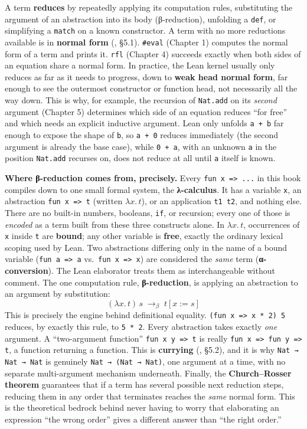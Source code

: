 A term \textbf{reduces} by repeatedly applying its computation rules, substituting the argument of an abstraction into its body (β-reduction), unfolding a \texttt{def}, or simplifying a \texttt{match} on a known constructor. A term with no more reductions available is in \textbf{normal form} (\cite{Pierce2002}, §5.1). \texttt{\#eval} (Chapter 1) computes the normal form of a term and prints it. \texttt{rfl} (Chapter 4) succeeds exactly when both sides of an equation share a normal form. In practice, the Lean kernel usually only reduces as far as it needs to progress, down to \textbf{weak head normal form}, far enough to see the outermost constructor or function head, not necessarily all the way down. This is why, for example, the recursion of \texttt{Nat.add} on its \emph{second} argument (Chapter 5) determines which side of an equation reduces ``for free'' and which needs an explicit inductive argument. Lean only unfolds \texttt{a + b} far enough to expose the shape of \texttt{b}, so \texttt{a + 0} reduces immediately (the second argument is already the base case), while \texttt{0 + a}, with an unknown \texttt{a} in the position \texttt{Nat.add} recurses on, does not reduce at all until \texttt{a} itself is known.

\textbf{Where β-reduction comes from, precisely.} Every \texttt{fun x => ...} in this book compiles down to one small formal system, the \textbf{λ-calculus}. It has a variable \texttt{x}, an abstraction \texttt{fun x => t} (written \(\lambda x.\, t\)), or an application \texttt{t1 t2}, and nothing else. There are no built-in numbers, booleans, \texttt{if}, or recursion; every one of those is \emph{encoded} as a term built from these three constructs alone. In \(\lambda x.\, t\), occurrences of \texttt{x} inside \texttt{t} are \textbf{bound}; any other variable is \textbf{free}, exactly the ordinary lexical scoping used by Lean. Two abstractions differing only in the name of a bound variable (\texttt{fun a => a} vs.~\texttt{fun x => x}) are considered the \emph{same} term (\textbf{α-conversion}). The Lean elaborator treats them as interchangeable without comment. The one computation rule, \textbf{β-reduction}, is applying an abstraction to an argument by substitution: \[
(\lambda x.\, t)\, s \;\longrightarrow_\beta\; t[x := s]
\] This is precisely the engine behind definitional equality. \texttt{(fun x => x * 2) 5} reduces, by exactly this rule, to \texttt{5 * 2}. Every abstraction takes exactly \emph{one} argument. A ``two-argument function'' \texttt{fun x y => t} is really \texttt{fun x => fun y => t}, a function returning a function. This is \textbf{currying} (\cite{Pierce2002}, §5.2), and it is why \texttt{Nat → Nat → Nat} is genuinely \texttt{Nat → (Nat → Nat)}, one argument at a time, with no separate multi-argument mechanism underneath. Finally, the \textbf{Church--Rosser theorem} guarantees that if a term has several possible next reduction steps, reducing them in any order that terminates reaches the \emph{same} normal form. This is the theoretical bedrock behind never having to worry that elaborating an expression ``the wrong order'' gives a different answer than ``the right order.''

